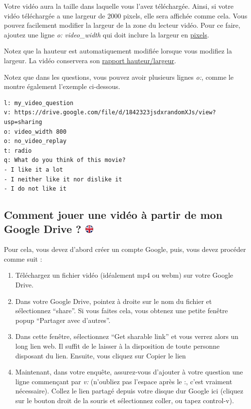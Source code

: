 \documentclass[
]{book}
\providecommand{\tightlist}{%
  \setlength{\itemsep}{0pt}\setlength{\parskip}{0pt}}
\begin{document}
Votre vidéo aura la taille dans laquelle vous l'avez téléchargée. Ainsi, si votre vidéo téléchargée a une largeur de 2000 pixels, elle sera affichée comme cela. Vous pouvez facilement modifier la largeur de la zone du lecteur vidéo. Pour ce faire, ajoutez une ligne \emph{o: video\_width} qui doit inclure la largeur en \href{https://fr.wikipedia.org/wiki/Pixel}{pixels}.

Notez que la hauteur est automatiquement modifiée lorsque vous modifiez la largeur. La vidéo conservera son \href{https://fr.wikipedia.org/wiki/Aspect_ratio}{rapport hauteur/largeur}.

Notez que dans les questions, vous pouvez avoir plusieurs lignes \emph{o:}, comme le montre également l'exemple ci-dessous.

\begin{verbatim}
l: my_video_question
v: https://drive.google.com/file/d/1842323jsdxrandomXJs/view?usp=sharing
o: video_width 800
o: no_video_replay
t: radio
q: What do you think of this movie?
- I like it a lot
- I neither like it nor dislike it
- I do not like it
\end{verbatim}

\hypertarget{comment-jouer-une-viduxe9o-uxe0-partir-de-mon-google-drive}{%
\subsection[Comment jouer une vidéo à partir de mon Google Drive ? ]{\texorpdfstring{Comment jouer une vidéo à partir de mon Google Drive ? \href{https://www.psytoolkit.org/lessons/surveyaudiovideo.html\#_how_to_play_a_video_from_my_google_drive}{\protect\includegraphics{img/ukflag.png}}}{Comment jouer une vidéo à partir de mon Google Drive ? }}\label{comment-jouer-une-viduxe9o-uxe0-partir-de-mon-google-drive}}

Pour cela, vous devez d'abord créer un compte Google, puis, vous devez procéder comme suit :

\begin{enumerate}
\def\labelenumi{\arabic{enumi}.}
\tightlist
\item
  Téléchargez un fichier vidéo (idéalement mp4 ou webm) sur votre Google Drive.
\item
  Dans votre Google Drive, pointez à droite sur le nom du fichier et sélectionnez ``share''. Si vous faites cela, vous obtenez une petite fenêtre popup ``Partager avec d'autres''.
\item
  Dans cette fenêtre, sélectionnez ``Get sharable link'' et vous verrez alors un long lien web. Il suffit de le laisser à la disposition de toute personne disposant du lien. Ensuite, vous cliquez sur Copier le lien
\item
  Maintenant, dans votre enquête, assurez-vous d'ajouter à votre question une ligne commençant par \emph{v: } (n'oubliez pas l'espace après le :, c'est vraiment nécessaire). Collez le lien partagé depuis votre disque dur Google ici (cliquez sur le bouton droit de la souris et sélectionnez coller, ou tapez control-v).
\end{enumerate}
\end{document}
